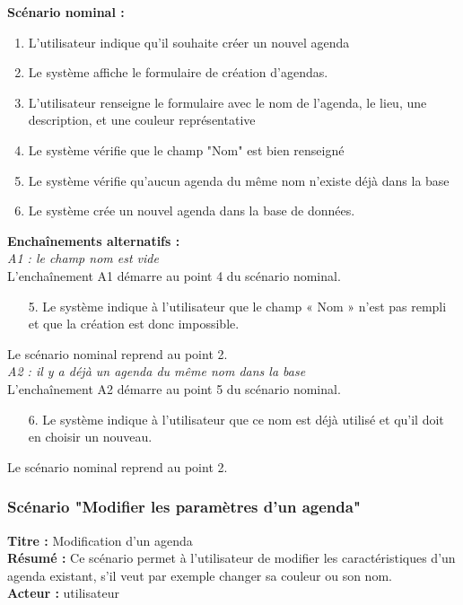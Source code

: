 \documentclass[12pt , a4paper]{article}
\begin{document}
\noindent\textbf{Scénario nominal :}
\begin{enumerate}
\item L’utilisateur indique qu'il souhaite créer un nouvel agenda 
\item Le système affiche le formulaire de création d’agendas.
\item L'utilisateur renseigne le formulaire avec le nom de l'agenda, le lieu, une description, et une couleur représentative
\item Le système vérifie que le champ "Nom" est bien renseigné
\item Le système vérifie qu’aucun agenda du même nom n’existe déjà dans la base
\item Le système crée un nouvel agenda dans la base de données.\\
\end{enumerate}


\noindent\textbf{Encha\^inements alternatifs :}\\
\noindent\textit{A1 : le champ nom est vide}\\
L'encha\^inement A1 démarre au point 4 du scénario nominal.
\begin{enumerate}
\item[5.] Le système indique à l’utilisateur que le champ « Nom » n’est pas rempli et que la création est donc impossible.
\end{enumerate}
Le scénario nominal reprend au point 2.\\


\noindent\textit{A2 : il y a déjà un agenda du même nom dans la base}\\
L'encha\^inement A2 démarre au point 5 du scénario nominal.
\begin{enumerate}
\item[6.] Le système indique à l’utilisateur que ce nom est déjà utilisé et qu’il doit en choisir un nouveau.
\end{enumerate}
Le scénario nominal reprend au point 2.\\

\newpage
\subsubsection{Scénario "Modifier les paramètres d'un agenda"}
\noindent\textbf{Titre : } Modification d’un agenda\\
\textbf{Résumé : } Ce scénario permet à l’utilisateur de modifier les caractéristiques d’un agenda existant, s’il veut par exemple changer sa couleur ou son nom.\\
\textbf{Acteur : }utilisateur\\
\end{document}
